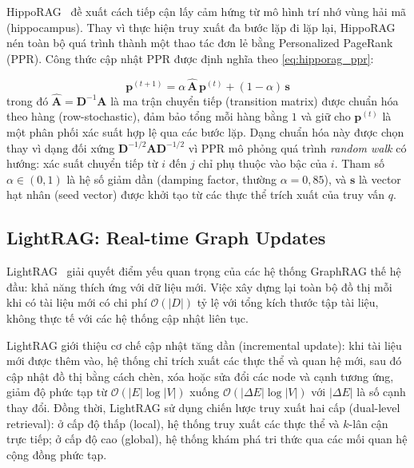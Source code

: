 \documentclass[12pt,a4paper]{report}
\theoremstyle{plain}
\theoremstyle{definition}
\begin{document}
	HippoRAG~\cite{gutierrez2024hipporag} đề xuất cách tiếp cận lấy cảm hứng từ
	mô hình trí nhớ vùng hải mã (hippocampus). Thay vì thực hiện truy xuất đa bước
	lặp đi lặp lại, HippoRAG nén toàn bộ quá trình thành một thao tác đơn lẻ bằng
	Personalized PageRank (PPR). Công thức cập nhật PPR được định nghĩa theo
	\eqref{eq:hipporag_ppr}:
	
	\begin{equation}
		\mathbf{p}^{(t+1)}
		= \alpha\,\hat{\mathbf{A}}\,\mathbf{p}^{(t)}
		+ (1-\alpha)\,\mathbf{s}
		\label{eq:hipporag_ppr}
	\end{equation}
	trong đó $\hat{\mathbf{A}} = \mathbf{D}^{-1}\mathbf{A}$ là ma trận chuyển tiếp
	(transition matrix) được chuẩn hóa theo hàng (row-stochastic), đảm bảo tổng mỗi
	hàng bằng $1$ và giữ cho $\mathbf{p}^{(t)}$ là một phân phối xác suất hợp lệ
	qua các bước lặp. Dạng chuẩn hóa này được chọn thay vì dạng đối xứng
	$\mathbf{D}^{-1/2}\mathbf{A}\mathbf{D}^{-1/2}$ vì PPR mô phỏng quá trình
	\emph{random walk} có hướng: xác suất chuyển tiếp từ $i$ đến $j$ chỉ phụ
	thuộc vào bậc của $i$. Tham số $\alpha \in (0,1)$ là hệ số giảm dần
	(damping factor, thường $\alpha = 0{,}85$), và $\mathbf{s}$ là vector hạt
	nhân (seed vector) được khởi tạo từ các thực thể trích xuất của truy vấn $q$.
	
	\subsection{LightRAG: Real-time Graph Updates}
	\label{subsec:lightrag}
	
	LightRAG~\cite{guo2024lightrag} giải quyết điểm yếu quan trọng của các hệ
	thống GraphRAG thế hệ đầu: khả năng thích ứng với dữ liệu mới. Việc xây dựng
	lại toàn bộ đồ thị mỗi khi có tài liệu mới có chi phí $\mathcal{O}(|D|)$ tỷ
	lệ với tổng kích thước tập tài liệu, không thực tế với các hệ thống cập nhật
	liên tục.
	
	LightRAG giới thiệu cơ chế cập nhật tăng dần (incremental update): khi tài
	liệu mới được thêm vào, hệ thống chỉ trích xuất các thực thể và quan hệ mới,
	sau đó cập nhật đồ thị bằng cách chèn, xóa hoặc sửa đổi các node và cạnh
	tương ứng, giảm độ phức tạp từ $\mathcal{O}(|E|\log|V|)$ xuống
	$\mathcal{O}(|\Delta E|\log|V|)$ với $|\Delta E|$ là số cạnh thay đổi. Đồng
	thời, LightRAG sử dụng chiến lược truy xuất hai cấp (dual-level retrieval):
	ở cấp độ thấp (local), hệ thống truy xuất các thực thể và $k$-lân cận trực
	tiếp; ở cấp độ cao (global), hệ thống khám phá tri thức qua các mối quan hệ
	cộng đồng phức tạp.
	
\end{document}
